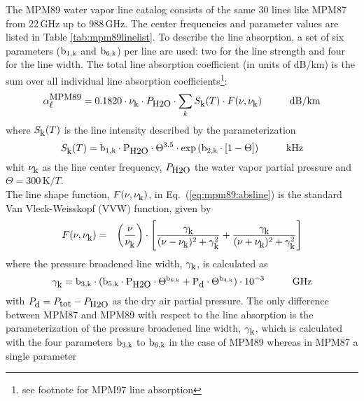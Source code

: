 {
\label{levele:mpm89_h2olines}
The MPM89 water vapor line catalog consists of the same 30 lines 
like MPM87 from 22\,GHz up to 988\,GHz. The center frequencies and parameter 
values are listed in Table \ref{tab:mpm89linelist}. To describe the line 
absorption, a set of six parameters ($\rm b_{\rm 1,k}$ and $\rm b_{\rm 6,k}$) per line are used: two 
for the line strength and four for the line width. The total line 
absorption coefficient (in units of dB/km) is the sum over all
individual line absorption coefficients\footnote{see footnote for
  MPM97 line absorption}:
\begin{equation}
  \label{eq:mpm89:absline}
  \alphampmml = 0.1820 \cdot \nuk \cdot \phzo \cdot 
  \sum_{k}{\inten \cdot \shape}\hspace*{10mm}\mbox{dB/km}
\end{equation}
where $S_{\mbox{\rm \small k}}(T)$ is the line intensity described by the parameterization
\begin{equation}
  \label{eq:mpm89:strength}
  \inten = \bek \cdot \phzo \cdot \Theta^{3.5} 
           \cdot \exp{(\bzk \cdot [1-\Theta])}\hspace*{10mm}\mbox{kHz}
\end{equation}
whit $\nu_{\mbox{\rm \small k}}$ as the line center frequency, $P_{\mbox{\rm \small H2O}}$ the water
vapor partial pressure and $\Theta = 300\,\mbox{K}/T$.\\
The line shape function, $F(\nu,\nu_{\mbox{\rm \small k}})$, in Eq.~(\ref{eq:mpm89:absline}) 
is the standard Van Vleck-Weisskopf (VVW) function, given by 
\begin{eqnarray}
  \label{eq:mpm89:VVW}
  F(\nu,\nu_{\mbox{\rm \small k}}) & = & \left(\frac{\nu}{\nu_{\mbox{\rm \small k}}}\right) \cdot 
               \left[\frac{\gamma_{\mbox{\rm \small k}}}{(\nu - \nu_{\mbox{\rm \small k}})^2 + \gamma_{\mbox{\rm \small k}}^2} + 
                     \frac{\gamma_{\mbox{\rm \small k}}}{(\nu + \nu_{\mbox{\rm \small k}})^2 + \gamma_{\mbox{\rm \small k}}^2}\right]
\end{eqnarray}
where the pressure broadened line width, $\gamma_{\mbox{\rm \small k}}$, is calculated as
\begin{equation}
  \label{eq:mpm89:gamma}
  \gamk = \bdk \cdot 
         (\bfk \cdot \phzo \cdot \Theta^{\bsk} + 
                     \pda  \cdot \Theta^{\bvk})
        \cdot 10^{-3}\hspace*{10mm}\mbox{GHz}
\end{equation}
with $P_{\mbox{\rm \small d}}=P_{\mbox{\rm \small tot}}-P_{\mbox{\rm \small H2O}}$ as the dry air partial pressure. 
The only difference between MPM87 and MPM89 with respect to the line 
absorption is the parameterization of the pressure broadened line
width, $\gamma_{\mbox{\rm \small k}}$, which is calculated with the four parameters $\rm b_{\rm 3,k}$ to
$\rm b_{\rm 6,k}$ in the case of MPM89 whereas in MPM87 a single parameter
}
